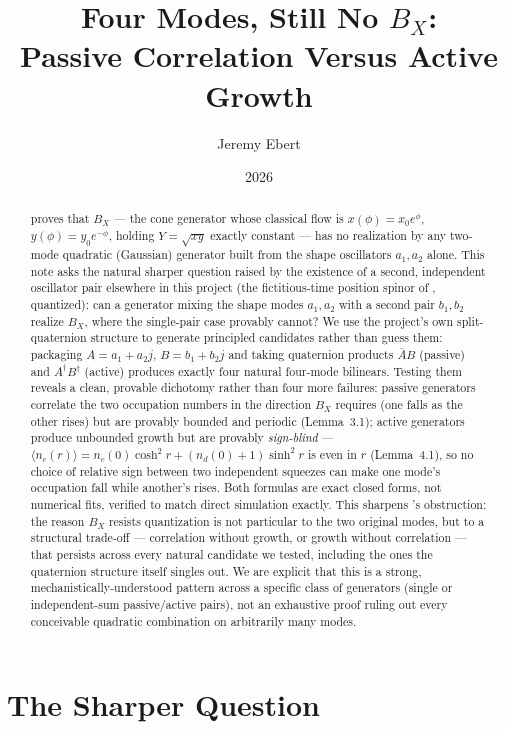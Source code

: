 \documentclass[12pt]{amsart}
\title[Four Modes, Still No $B_X$]{Four Modes, Still No $B_X$:\\
Passive Correlation Versus Active Growth}
\author{Jeremy Ebert}
\date{2026}
\theoremstyle{plain}
\theoremstyle{remark}
\begin{document}
\maketitle

\begin{abstract}
\cite{Ebert2026Quantum} proves that $B_X$ --- the cone generator whose classical flow is $x(\phi)=x_0e^\phi$, $y(\phi)=y_0e^{-\phi}$, holding $Y=\sqrt{xy}$ exactly constant --- has no realization by any two-mode quadratic (Gaussian) generator built from the shape oscillators $a_1,a_2$ alone. This note asks the natural sharper question raised by the existence of a second, independent oscillator pair elsewhere in this project (the fictitious-time position spinor of \cite{Ebert2026LeviCivita}, quantized): can a generator mixing the shape modes $a_1,a_2$ with a second pair $b_1,b_2$ realize $B_X$, where the single-pair case provably cannot? We use the project's own split-quaternion structure to generate principled candidates rather than guess them: packaging $A=a_1+a_2j$, $B=b_1+b_2j$ and taking quaternion products $\bar AB$ (passive) and $A^\dagger B^\dagger$ (active) produces exactly four natural four-mode bilinears. Testing them reveals a clean, provable dichotomy rather than four more failures: passive generators correlate the two occupation numbers in the direction $B_X$ requires (one falls as the other rises) but are provably bounded and periodic (Lemma~3.1); active generators produce unbounded growth but are provably \emph{sign-blind} --- $\langle n_c(r)\rangle=n_c(0)\cosh^2r+(n_d(0)+1)\sinh^2r$ is even in $r$ (Lemma~4.1), so no choice of relative sign between two independent squeezes can make one mode's occupation fall while another's rises. Both formulas are exact closed forms, not numerical fits, verified to match direct simulation exactly. This sharpens \cite{Ebert2026Quantum}'s obstruction: the reason $B_X$ resists quantization is not particular to the two original modes, but to a structural trade-off --- correlation without growth, or growth without correlation --- that persists across every natural candidate we tested, including the ones the quaternion structure itself singles out. We are explicit that this is a strong, mechanistically-understood pattern across a specific class of generators (single or independent-sum passive/active pairs), not an exhaustive proof ruling out every conceivable quadratic combination on arbitrarily many modes.
\end{abstract}

\section{The Sharper Question}
\end{document}
